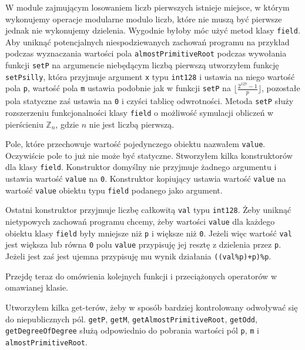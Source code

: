 \documentclass{article}
\begin{document}
W module zajmującym losowaniem liczb pierwszych istnieje miejsce, w którym wykonujemy operacje modularne modulo liczb,
które nie muszą być pierwsze jednak nie wykonujemy dzielenia. Wygodnie byłoby móc użyć metod klasy 
\texttt{field}. Aby uniknąć potencjalnych niespodziewanych zachowań programu na przykład podczas wyznaczania wartości pola 
\texttt{almostPrimitiveRoot} podczas wywołania funkcji \texttt{setP} na 
argumencie niebędącym liczbą pierwszą utworzyłem funkcję \texttt{setPsilly}, która przyjmuje argument
\texttt{x} typu \texttt{\textunderscore \textunderscore int128} i ustawia na niego wartość
pola \texttt{p}, wartość pola \texttt{m} ustawia podobnie jak w funkcji \texttt{setP} na  
$\lfloor \frac{2^{127}-1}{p} \rfloor$, pozostałe pola statyczne zaś ustawia na \texttt{0} i czyści tablicę odwrotności.
Metoda \texttt{setP} służy rozszerzeniu funkcjonalności klasy \texttt{field} o możliwość symulacji obliczeń w 
pierścieniu $\mathbb{Z}_n$, gdzie $n$ nie jest liczbą pierwszą.



Pole, które przechowuje wartość pojedynczego obiektu nazwałem \texttt{value}. Oczywiście
pole to już nie może być statyczne.
Stworzyłem kilka konstruktorów dla klasy \texttt{field}. Konstruktor domyślny
nie przyjmuje żadnego argumentu i ustawia wartość \texttt{value} na \texttt{0}.
Konstruktor kopiujący ustawia wartość \texttt{value} na wartość \texttt{value} obiektu 
typu \texttt{field} podanego jako argument. 

Ostatni konstruktor przyjmuje liczbę całkowitą \texttt{val} 
typu \texttt{\textunderscore \textunderscore int128}. Żeby uniknąć nietypowych zachowań programu chcemy, żeby wartości \texttt{value} dla 
każdego obiektu klasy \texttt{field} były mniejsze niż \texttt{p} i większe niż \texttt{0}. Jeżeli więc wartość \texttt{val}
jest większa lub równa \texttt{0} polu \texttt{value} przypisuję
jej resztę z dzielenia przez \texttt{p}. Jeżeli jest zaś jest ujemna przypisuję mu wynik działania \texttt{((val\%p)+p)\%p}.



Przejdę teraz do omówienia kolejnych funkcji i przeciążonych operatorów
w omawianej klasie.

Utworzyłem kilka get-terów, żeby w sposób bardziej kontrolowany odwoływać się do niepublicznych pól. 
\texttt{getP}, \texttt{getM}, \texttt{getAlmostPrimitiveRoot}, \texttt{getOdd}, \texttt{getDegreeOfDegree}
służą odpowiednio do pobrania wartości pól \texttt{p}, \texttt{m} i \texttt{almostPrimitiveRoot}.
\end{document}
